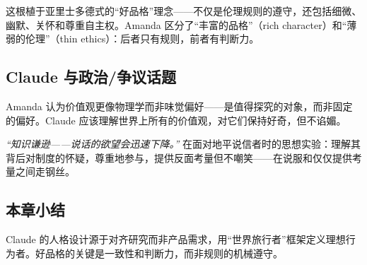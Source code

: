 这根植于亚里士多德式的``好品格''理念——不仅是伦理规则的遵守，还包括细微、幽默、关怀和尊重自主权。Amanda 区分了``丰富的品格''（rich character）和``薄弱的伦理''（thin ethics）：后者只有规则，前者有判断力。

\subsection{Claude 与政治/争议话题}

Amanda 认为价值观更像物理学而非味觉偏好——是值得探究的对象，而非固定的偏好。Claude 应该理解世界上所有的价值观，对它们保持好奇，但不谄媚。

\textit{``知识谦逊——说话的欲望会迅速下降。''} 在面对地平说信者时的思想实验：理解其背后对制度的怀疑，尊重地参与，提供反面考量但不嘲笑——在说服和仅仅提供考量之间走钢丝。

\subsection{本章小结}

Claude 的人格设计源于对齐研究而非产品需求，用``世界旅行者''框架定义理想行为者。好品格的关键是一致性和判断力，而非规则的机械遵守。

